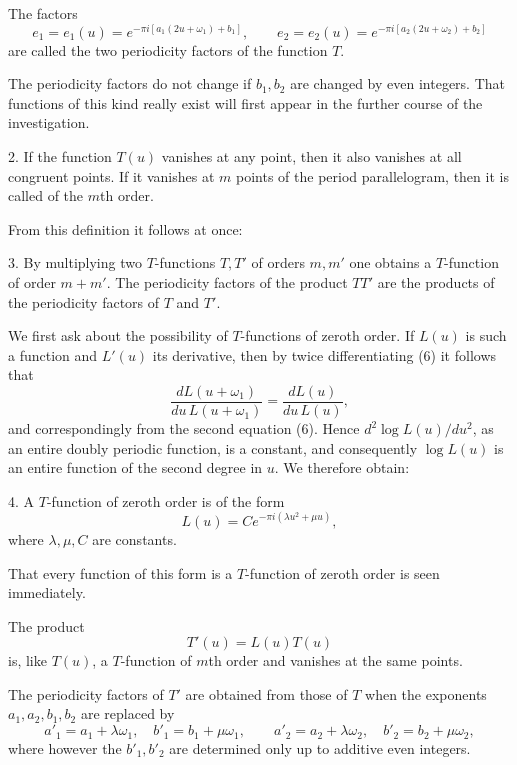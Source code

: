 \documentclass[11pt]{article}
\begin{document}
The factors
\[
e_1=e_1(u)=e^{-\pi i[a_1(2u+\omega_1)+b_1]},\qquad
e_2=e_2(u)=e^{-\pi i[a_2(2u+\omega_2)+b_2]}
\]
are called the two periodicity factors of the function $T$.

The periodicity factors do not change if $b_1,b_2$ are changed by even integers. That functions of this kind really exist will first appear in the further course of the investigation.

2. If the function $T(u)$ vanishes at any point, then it also vanishes at all congruent points. If it vanishes at $m$ points of the period parallelogram, then it is called of the $m$th order.

From this definition it follows at once:

3. By multiplying two $T$-functions $T,T'$ of orders $m,m'$ one obtains a $T$-function of order $m+m'$. The periodicity factors of the product $TT'$ are the products of the periodicity factors of $T$ and $T'$.

We first ask about the possibility of $T$-functions of zeroth order. If $L(u)$ is such a function and $L'(u)$ its derivative, then by twice differentiating (6) it follows that
\[
\frac{dL(u+\omega_1)}{du\,L(u+\omega_1)}=\frac{dL(u)}{du\,L(u)},
\]
and correspondingly from the second equation (6). Hence $d^2\log L(u)/du^2$, as an entire doubly periodic function, is a constant, and consequently $\log L(u)$ is an entire function of the second degree in $u$. We therefore obtain:

4. A $T$-function of zeroth order is of the form
\begin{equation}
L(u)=Ce^{-\pi i(\lambda u^2+\mu u)},
\tag{7}
\end{equation}
where $\lambda,\mu,C$ are constants.

That every function of this form is a $T$-function of zeroth order is seen immediately.

The product
\begin{equation}
T'(u)=L(u)T(u)
\tag{8}
\end{equation}
is, like $T(u)$, a $T$-function of $m$th order and vanishes at the same points.

The periodicity factors of $T'$ are obtained from those of $T$ when the exponents $a_1,a_2,b_1,b_2$ are replaced by
\begin{equation}
a'_1=a_1+\lambda\omega_1,\quad
b'_1=b_1+\mu\omega_1,\qquad
a'_2=a_2+\lambda\omega_2,\quad
b'_2=b_2+\mu\omega_2,
\tag{9}
\end{equation}
where however the $b'_1,b'_2$ are determined only up to additive even integers.
\end{document}
